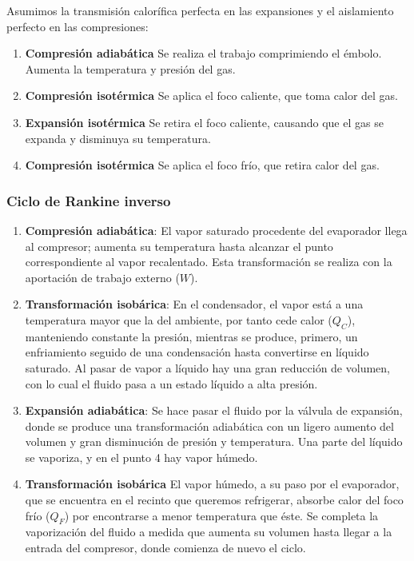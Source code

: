 \documentclass[10pt]{article}
\begin{document}
Asumimos la transmisión calorífica perfecta en las expansiones y el aislamiento perfecto en las compresiones:

\begin{enumerate}
  \item \textbf{Compresión adiabática} Se realiza el trabajo comprimiendo el émbolo. Aumenta la temperatura y presión del gas.
  \item \textbf{Compresión isotérmica} Se aplica el foco caliente, que toma calor del gas.
  \item \textbf{Expansión isotérmica} Se retira el foco caliente, causando que el gas se expanda y disminuya su temperatura.
  \item \textbf{Compresión isotérmica} Se aplica el foco frío, que retira calor del gas.
\end{enumerate}

\begin{center}
\end{center}

\subsubsection{Ciclo de Rankine inverso}

\begin{enumerate}
  \item \textbf{Compresión adiabática}: El vapor saturado procedente del evaporador llega al compresor; aumenta su temperatura hasta alcanzar el punto
    correspondiente al vapor recalentado. Esta transformación se realiza con la aportación de trabajo externo ($ W $).
  \item \textbf{Transformación isobárica}: En el condensador, el vapor está a una temperatura mayor que la del ambiente, por tanto cede calor ($ Q_C $), manteniendo constante
    la presión, mientras se produce, primero, un enfriamiento seguido de una condensación hasta convertirse en líquido saturado. Al pasar de vapor a líquido hay una gran reducción
    de volumen, con lo cual el fluido pasa a un estado líquido a alta presión.
  \item \textbf{Expansión adiabática}: Se hace pasar el fluido por la válvula de expansión, donde se produce una transformación adiabática con un ligero aumento del volumen y
    gran disminución de presión y temperatura. Una parte del líquido se vaporiza, y en el punto 4 hay vapor húmedo.
  \item \textbf{Transformación isobárica} El vapor húmedo, a su paso por el evaporador, que se encuentra en el recinto que queremos refrigerar, absorbe calor del foco frío ($ Q_F $)
    por encontrarse a menor temperatura que éste. Se completa la vaporización del fluido a medida que aumenta su volumen hasta llegar a la entrada del compresor, donde comienza de
    nuevo el ciclo.
\end{enumerate}
\end{document}
